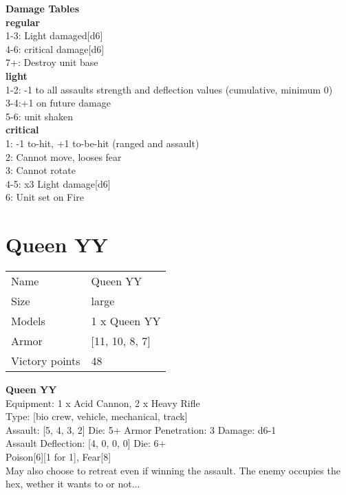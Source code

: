 {\bf Damage Tables} \\
 {\bf regular } \\
1-3: Light damaged[d6] \\
4-6: critical damage[d6] \\
7+: Destroy unit base \\
 {\bf light } \\
1-2: -1 to all assaults strength and deflection values (cumulative, minimum 0) \\
3-4:+1 on future damage \\
5-6: unit shaken \\
 {\bf critical } \\
1: -1 to-hit, +1 to-be-hit (ranged and assault) \\
2: Cannot move, looses fear \\
3: Cannot rotate \\
4-5: x3 Light damage[d6] \\
6: Unit set on Fire \\










\pagebreak\pagebreak

\section{ Queen YY }

\begin{tabular}{ll}
  Name & Queen YY \\
  Size & large\\
  Models & 1 x Queen YY\\
  Armor & [11, 10, 8, 7]\\
  Victory points & 48\\
\end{tabular}



{\bf Queen YY } \\
Equipment: 1 x Acid Cannon, 2 x Heavy Rifle \\
Type: [bio crew, vehicle, mechanical, track] \\

Assault: [5, 4, 3, 2] Die: 5+ Armor Penetration: 3 Damage: d6-1 \\
Assault Deflection: [4, 0, 0, 0] Die: 6+\\
\indent Poison[6][1 for 1], Fear[8]\\ 
May also choose to retreat even if winning the assault. The enemy occupies the hex, wether it wants to or not...\\ 
 


